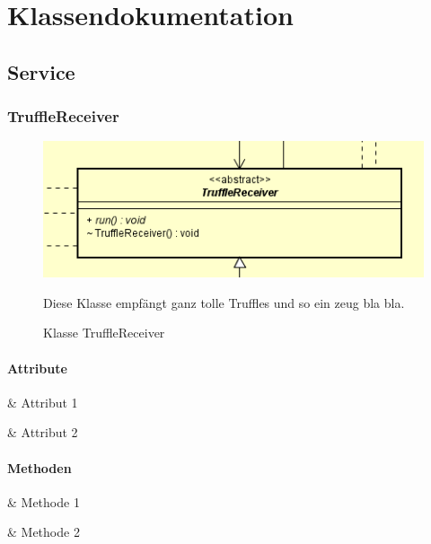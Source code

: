 \chapter{Klassendokumentation}

\section{Service}

\subsection{TruffleReceiver}

\begin{figure}[H]
    \centering
    \includegraphics[width=\textwidth]{../diagramimages/TruffleReceiver.png}
    \caption[Klasse TruffleReceiver]{Klasse TruffleReceiver}
    \medskip
    Diese Klasse empfängt ganz tolle Truffles und so ein zeug bla bla.
\end{figure}

\subsubsection*{Attribute}

\begin{easylist}[itemize]

    & Attribut 1

    & Attribut 2

\end{easylist}

\subsubsection*{Methoden}

\begin{easylist}[itemize]

    & Methode 1

    & Methode 2

\end{easylist}

